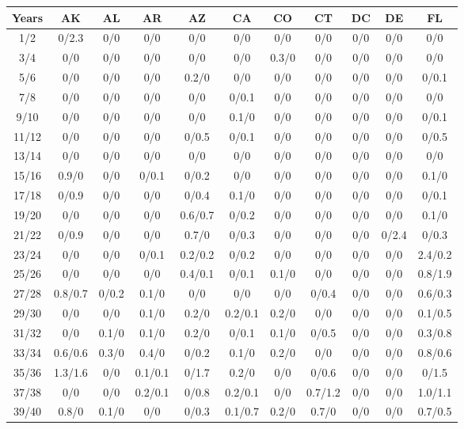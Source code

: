 
\begin{table*}[htb]
\footnotesize
    \centering
    \begin{tabular}{|c| c c c c c c c c c c |}\hline
        \textbf{Years} & \textbf{AK}& \textbf{AL}& \textbf{AR}& \textbf{AZ}& \textbf{CA}& \textbf{CO}& \textbf{CT}& \textbf{DC}& \textbf{DE}& \textbf{FL} \\\hline
    1/2&0/2.3& 0/0& 0/0& 0/0& 0/0& 0/0& 0/0& 0/0& 0/0& 0/0\\\hline
3/4&0/0& 0/0& 0/0& 0/0& 0/0& 0.3/0& 0/0& 0/0& 0/0& 0/0\\\hline
5/6&0/0& 0/0& 0/0& 0.2/0& 0/0& 0/0& 0/0& 0/0& 0/0& 0/0.1\\\hline
7/8&0/0& 0/0& 0/0& 0/0& 0/0.1& 0/0& 0/0& 0/0& 0/0& 0/0\\\hline
9/10&0/0& 0/0& 0/0& 0/0& 0.1/0& 0/0& 0/0& 0/0& 0/0& 0/0.1\\\hline
11/12&0/0& 0/0& 0/0& 0/0.5& 0/0.1& 0/0& 0/0& 0/0& 0/0& 0/0.5\\\hline
13/14&0/0& 0/0& 0/0& 0/0& 0/0& 0/0& 0/0& 0/0& 0/0& 0/0\\\hline
15/16&0.9/0& 0/0& 0/0.1& 0/0.2& 0/0& 0/0& 0/0& 0/0& 0/0& 0.1/0\\\hline
17/18&0/0.9& 0/0& 0/0& 0/0.4& 0.1/0& 0/0& 0/0& 0/0& 0/0& 0/0.1\\\hline
19/20&0/0& 0/0& 0/0& 0.6/0.7& 0/0.2& 0/0& 0/0& 0/0& 0/0& 0.1/0\\\hline
21/22&0/0.9& 0/0& 0/0& 0.7/0& 0/0.3& 0/0& 0/0& 0/0& 0/2.4& 0/0.3\\\hline
23/24&0/0& 0/0& 0/0.1& 0.2/0.2& 0/0.2& 0/0& 0/0& 0/0& 0/0& 2.4/0.2\\\hline
25/26&0/0& 0/0& 0/0& 0.4/0.1& 0/0.1& 0.1/0& 0/0& 0/0& 0/0& 0.8/1.9\\\hline
27/28&0.8/0.7& 0/0.2& 0.1/0& 0/0& 0/0& 0/0& 0/0.4& 0/0& 0/0& 0.6/0.3\\\hline
29/30&0/0& 0/0& 0.1/0& 0.2/0& 0.2/0.1& 0.2/0& 0/0& 0/0& 0/0& 0.1/0.5\\\hline
31/32&0/0& 0.1/0& 0.1/0& 0.2/0& 0/0.1& 0.1/0& 0/0.5& 0/0& 0/0& 0.3/0.8\\\hline
33/34&0.6/0.6& 0.3/0& 0.4/0& 0/0.2& 0.1/0& 0.2/0& 0/0& 0/0& 0/0& 0.8/0.6\\\hline
35/36&1.3/1.6& 0/0& 0.1/0.1& 0/1.7& 0.2/0& 0/0& 0/0.6& 0/0& 0/0& 0/1.5\\\hline
37/38&0/0& 0/0& 0.2/0.1& 0/0.8& 0.2/0.1& 0/0& 0.7/1.2& 0/0& 0/0& 1.0/1.1\\\hline
39/40&0.8/0& 0.1/0& 0/0& 0/0.3& 0.1/0.7& 0.2/0& 0.7/0& 0/0& 0/0& 0.7/0.5\\\hline

\end{tabular}
\end{table*}
